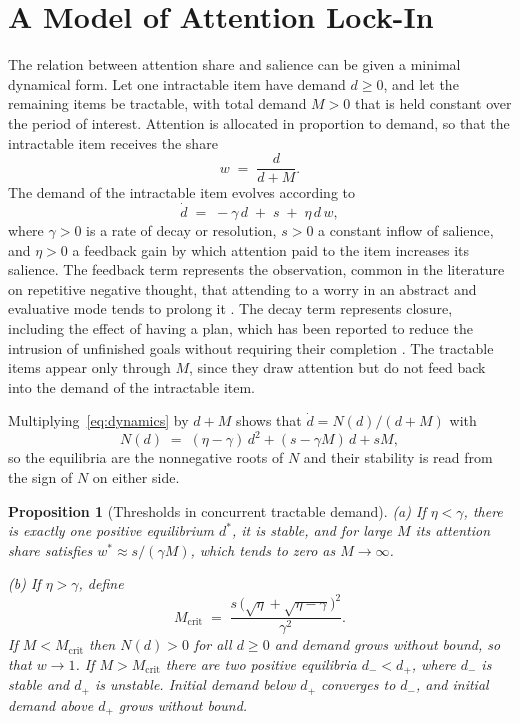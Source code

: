 \documentclass[11pt]{article}
\newtheorem{proposition}{Proposition}
\theoremstyle{definition}
\begin{document}
\section{A Model of Attention Lock-In}
\label{sec:lockin}

The relation between attention share and salience can be given a minimal dynamical form. Let one intractable item have demand $d\ge 0$, and let the remaining items be tractable, with total demand $M>0$ that is held constant over the period of interest. Attention is allocated in proportion to demand, so that the intractable item receives the share
\begin{equation}
w\;=\;\frac{d}{d+M}.
\label{eq:share}
\end{equation}
The demand of the intractable item evolves according to
\begin{equation}
\dot d\;=\;-\gamma\,d\;+\;s\;+\;\eta\,d\,w,
\label{eq:dynamics}
\end{equation}
where $\gamma>0$ is a rate of decay or resolution, $s>0$ a constant inflow of salience, and $\eta>0$ a feedback gain by which attention paid to the item increases its salience. The feedback term represents the observation, common in the literature on repetitive negative thought, that attending to a worry in an abstract and evaluative mode tends to prolong it \cite{nolen1991, watkins2008}. The decay term represents closure, including the effect of having a plan, which has been reported to reduce the intrusion of unfinished goals without requiring their completion \cite{masicampo2011}. The tractable items appear only through $M$, since they draw attention but do not feed back into the demand of the intractable item.

Multiplying~\eqref{eq:dynamics} by $d+M$ shows that $\dot d=N(d)/(d+M)$ with
\begin{equation}
N(d)\;=\;(\eta-\gamma)\,d^{2}+(s-\gamma M)\,d+sM,
\label{eq:numerator}
\end{equation}
so the equilibria are the nonnegative roots of $N$ and their stability is read from the sign of $N$ on either side.

\begin{proposition}[Thresholds in concurrent tractable demand]
\emph{(a)} If $\eta<\gamma$, there is exactly one positive equilibrium $d^{*}$, it is stable, and for large $M$ its attention share satisfies $w^{*}\approx s/(\gamma M)$, which tends to zero as $M\to\infty$.

\emph{(b)} If $\eta>\gamma$, define
\begin{equation}
M_{\mathrm{crit}}\;=\;\frac{s\,\bigl(\sqrt{\eta}+\sqrt{\eta-\gamma}\bigr)^{2}}{\gamma^{2}}.
\label{eq:mcrit}
\end{equation}
If $M<M_{\mathrm{crit}}$ then $N(d)>0$ for all $d\ge 0$ and demand grows without bound, so that $w\to 1$. If $M>M_{\mathrm{crit}}$ there are two positive equilibria $d_{-}<d_{+}$, where $d_{-}$ is stable and $d_{+}$ is unstable. Initial demand below $d_{+}$ converges to $d_{-}$, and initial demand above $d_{+}$ grows without bound.
\end{proposition}
\end{document}
